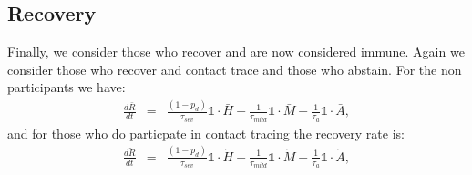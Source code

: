 \documentclass[notitlepage, superscriptaddress]{revtex4-2}
\begin{document}
\subsection{Recovery}
Finally, we consider those who recover and are now considered immune. Again we consider those who recover and contact trace and those who abstain. For the non participants we have:
\begin{eqnarray}
\frac{d\bar{R}}{dt} &=& \frac{(1 - p_{d})}{\tau_{sev}} \mathbb{1} \cdot \bar{H} + \frac{1}{\tau_{mild}} \mathbb{1}\cdot \bar{M} + \frac{1}{\tau_{a}} \mathbb{1}\cdot \bar{A},
\end{eqnarray}
and for those who do particpate in contact tracing the recovery rate is:
\begin{eqnarray}
\frac{d\check{R}}{dt} &=& \frac{(1 - p_{d})}{\tau_{sev}} \mathbb{1} \cdot \check{H} + \frac{1}{\tau_{mild}} \mathbb{1}\cdot \check{M} + \frac{1}{\tau_{a}} \mathbb{1}\cdot \check{A},
\end{eqnarray}
\end{document}
